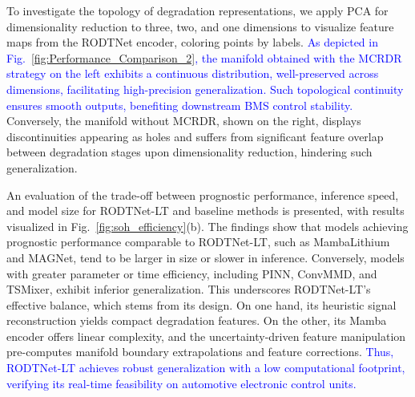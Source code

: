 \documentclass[lettersize,journal]{IEEEtran}
\newcommand{\rev}[1]{\textcolor{blue}{#1}}
\begin{document}
To investigate the topology of degradation representations, we apply PCA for dimensionality reduction to three, two, and one dimensions to visualize feature maps from the RODTNet encoder, coloring points by labels. \rev{As depicted in Fig.~\ref{fig:Performance_Comparison_2}, the manifold obtained with the MCRDR strategy on the left exhibits a continuous distribution, well-preserved across dimensions, facilitating high-precision generalization. Such topological continuity ensures smooth outputs, benefiting downstream BMS control stability.} Conversely, the manifold without MCRDR, shown on the right, displays discontinuities appearing as holes and suffers from significant feature overlap between degradation stages upon dimensionality reduction, hindering such generalization.

An evaluation of the trade-off between prognostic performance, inference speed, and model size for RODTNet-LT and baseline methods is presented, with results visualized in Fig.~\ref{fig:soh_efficiency}(b). The findings show that models achieving prognostic performance comparable to RODTNet-LT, such as MambaLithium and MAGNet, tend to be larger in size or slower in inference. Conversely, models with greater parameter or time efficiency, including PINN, ConvMMD, and TSMixer, exhibit inferior generalization. This underscores RODTNet-LT's effective balance, which stems from its design. On one hand, its heuristic signal reconstruction yields compact degradation features. On the other, its Mamba encoder offers linear complexity, and the uncertainty-driven feature manipulation pre-computes manifold boundary extrapolations and feature corrections. \rev{Thus, RODTNet-LT achieves robust generalization with a low computational footprint, verifying its real-time feasibility on automotive electronic control units.}
\end{document}
